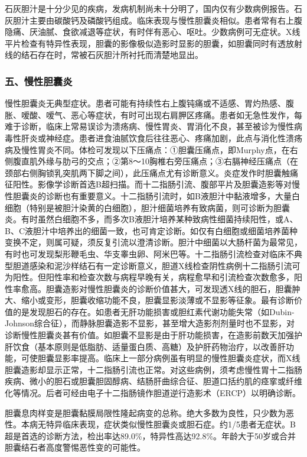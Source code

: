 石灰胆汁是十分少见的疾病，发病机制尚未十分明了，国内仅有少数病例报告。石灰胆汁主要由碳酸钙及磷酸钙组成。临床表现与慢性胆囊炎相似。患者常有右上腹隐痛、厌油腻、食欲减退等症状，有时伴有恶心、呕吐。少数病例可无症状。X线平片检查有特异性表现，胆囊的影像极似造影时显影的胆囊，如胆囊同时有透放射线的结石存在时，常被石灰胆汁所衬托而清楚地显出。

\subsubsection{五、慢性胆囊炎}

慢性胆囊炎无典型症状。患者可能有持续性右上腹钝痛或不适感、胃灼热感、腹胀、嗳酸、嗳气、恶心等症状，有时可出现右肩胛区疼痛。患者如无急性发作，每难于诊断，临床上常易误诊为溃疡病、慢性胃炎、胃消化不良，甚至被诊为慢性病毒性肝炎或神经症。患者进食油腻饮食后往往恶心、疼痛加剧，此点与消化性溃疡病及慢性胃炎不同。体检可发现以下压痛点：①胆囊压痛点，即Murphy点，在右侧腹直肌外缘与肋弓的交点；②第8～10胸椎右旁压痛点；③右膈神经压痛点（在颈部右侧胸锁乳突肌两下脚之间），此压痛点尤有诊断意义。炎症发作时胆囊触痛征阳性。影像学诊断首选B超扫描。而十二指肠引流、腹部平片及胆囊造影等对慢性胆囊炎的诊断也有重要意义。十二指肠引流时，如B液胆汁中黏液增多，大量白细胞（特别是被胆汁染黄的白细胞），胆汁细菌培养有致病菌，则可诊断为胆囊炎。有时虽然白细胞不多，而多次B液胆汁培养某种致病性细菌持续阳性，或A、B、C液胆汁中培养出的细菌一致，也可肯定诊断。如仅有白细胞或细菌培养菌种变换不定，则属可疑，须反复引流以澄清诊断。胆汁中细菌以大肠杆菌为最常见，有时也可发现梨形鞭毛虫、华支睾虫卵、阿米巴等。十二指肠引流检查对临床不典型胆道感染和泥沙样结石有一定诊断意义，胆道X线检查阴性病例十二指肠引流可为阳性。但阳性率和检查次数与病程早晚有关，病程愈早和引流检查次数愈多，阳性率愈高。胆囊造影对慢性胆囊炎的诊断价值甚大，可发现透X线的胆石，胆囊肿大、缩小或变形，胆囊收缩功能不良，胆囊显影淡薄或不显影等征象。最有诊断价值的是发现胆石的存在。如患者无肝功能损害或胆红素代谢功能失常（如Dubin-Johnson综合征），而静脉胆囊造影不显影，甚至增大造影剂剂量时也不显影，对诊断慢性胆囊炎甚有价值。如胆囊不显影是由于肝功能损害，在造影前数天加强护肝饮食（基本原则是低脂肪、适量蛋白质、高糖）及护肝药物治疗，以改善肝功能，可使胆囊显影率提高。临床上一部分病例虽有明显的慢性胆囊炎症状，而X线胆囊造影却显示正常，十二指肠引流也正常。对这些病例，须考虑慢性胃十二指肠疾病、微小的胆石或胆囊胆固醇病、结肠肝曲综合征、胆道口括约肌的痉挛或纤维化等情况。后者可经由电子十二指肠镜作胆道逆行造影术（ERCP）以明确诊断。

胆囊息肉样变是胆囊黏膜局限性隆起病变的总称。绝大多数为良性，只少数为恶性。本病无特异临床表现，症状类似慢性胆囊炎或胆石症。约1/5患者无症状。B超是首选的诊断方法，检出率达89.0\%，特异性高达92.8\%。年龄大于50岁或合并胆囊结石者高度警惕恶性变的可能性。

